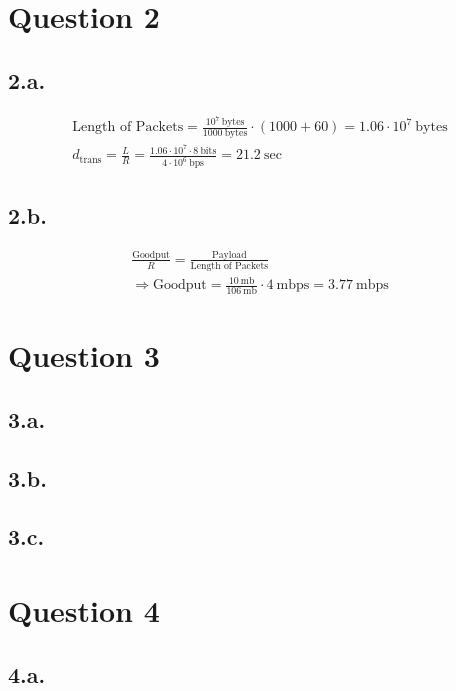 \documentclass[12pt]{article}
\begin{document}
\section{Question 2}

\subsection{2.a.}

\begin{gather}
    \text{Length of Packets} = \frac{10^7 \ \text{bytes}}{1000 \
    \text{bytes}} \cdot (1000 + 60) = 1.06 \cdot 10^7 \ \text{bytes}\\
    d_{\text{trans}} = \frac{L}{R} = \frac{1.06 \cdot 10^7 \cdot 8\ \text{bits}}{4 \cdot 10^6 \ \text{bps}} = 21.2 \ \text{sec}
\end{gather}

\subsection{2.b.}

\begin{gather}
    \frac{\text{Goodput}}{R} = \frac{\text{Payload}}{\text{Length of Packets}} \\
    \Longrightarrow \text{Goodput} = \frac{10 \ \text{mb}}{106 \ \text{mb}} \cdot 4 \ \text{mbps} = 3.77 \ \text{mbps}
\end{gather}


\section{Question 3}

\subsection{3.a.}
\subsection{3.b.}
\subsection{3.c.}


\section{Question 4}

\subsection{4.a.}
\end{document}
